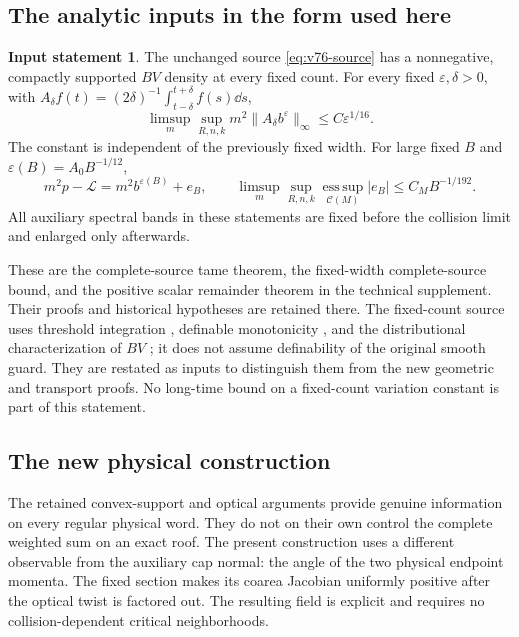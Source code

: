 \documentclass[11pt,reqno]{amsart}
\numberwithin{equation}{section}
\theoremstyle{definition}
\newtheorem{inputstatement}[theorem]{Input statement}
\theoremstyle{remark}\newtheorem{remark}[theorem]{Remark}
\newcommand{\esssup}{\operatorname*{ess\,sup}}
\begin{document}
\subsection{The analytic inputs in the form used here}
\begin{inputstatement}\label{input:v76-analytic}
The unchanged source \eqref{eq:v76-source} has a nonnegative,
compactly supported $BV$ density at every fixed count. For every
fixed $\varepsilon,\delta>0$, with
$A_\delta f(t)=(2\delta)^{-1}\int_{t-\delta}^{t+\delta}f(s)\dd s$,
\begin{equation}\label{eq:v76-average}
 \limsup_m\sup_{R,n,k}m^2\|A_\delta b^\varepsilon\|_\infty
                                      \le C\varepsilon^{1/16}.
\end{equation}
The constant is independent of the previously fixed width. For large
fixed $B$ and $\varepsilon(B)=A_0B^{-1/12}$,
\begin{equation}\label{eq:v76-remainder}
 m^2p-\mathcal L=m^2b^{\varepsilon(B)}+e_B,\qquad
 \limsup_m\sup_{R,n,k}\esssup_{\mathcal C(M)}|e_B|
                                     \le C_MB^{-1/192}.
\end{equation}
All auxiliary spectral bands in these statements are fixed before
the collision limit and enlarged only afterwards.
\end{inputstatement}
These are the complete-source tame theorem, the fixed-width
complete-source bound, and the positive scalar remainder theorem in
the technical supplement. Their proofs and historical hypotheses are
retained there. The fixed-count source uses threshold integration
\cite{CMInt}, definable monotonicity \cite{Coste}, and the
distributional characterization of $BV$ \cite{AFP}; it does not
assume definability of the original smooth guard. They are restated as inputs to distinguish them from
the new geometric and transport proofs. No long-time bound on a
fixed-count variation constant is part of this statement.


\subsection{The new physical construction}
The retained convex-support and optical arguments provide genuine
information on every regular physical word. They do not on their
own control the complete weighted sum on an exact roof. The present
construction uses a different observable from the auxiliary cap
normal: the angle of the two physical endpoint momenta. The fixed
section makes its coarea Jacobian uniformly positive after the
optical twist is factored out. The resulting field is explicit and
requires no collision-dependent critical neighborhoods.
\end{document}
